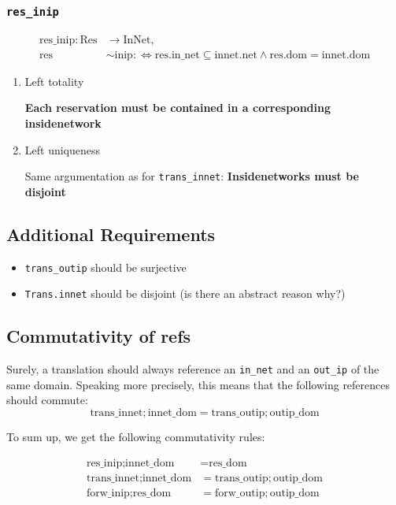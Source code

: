 \documentclass[11pt]{article}
\newcommand{\then}{\mathbin{;}}
\begin{document}
\subsubsection{\texttt{res\_inip}}
\label{sec:orgfc1458e}

\begin{align*}
\mathrm{res\_inip}\colon \mathrm{Res} &\to \mathrm{InNet},\\
\text{res} &\sim \text{inip} :\Leftrightarrow \text{res.in\_net} \subseteq \text{innet.net} \wedge \text{res.dom} = \text{innet.dom}
\end{align*}

\begin{enumerate}
\item Left totality
\label{sec:org8702994}

\textbf{\textbf{Each reservation must be contained in a corresponding insidenetwork}}

\item Left uniqueness
\label{sec:orgb32b1bd}

Same argumentation as for \texttt{trans\_innet}: \textbf{\textbf{Insidenetworks must be disjoint}}
\end{enumerate}

\subsection{Additional Requirements}
\label{sec:org5986b8c}

\begin{itemize}
\item \texttt{trans\_outip} should be surjective
\item \texttt{Trans.innet} should be disjoint (is there an abstract reason
why?)
\end{itemize}

\subsection{Commutativity of refs}
\label{sec:orgd22b6b6}

Surely, a translation should always reference an \texttt{in\_net} and an
\texttt{out\_ip} of the same domain.  Speaking more precisely, this means that
the following references should commute:$$
\text{trans\_innet}\then\text{innet\_dom} = \text{trans\_outip}\then\text{outip\_dom}
$$

To sum up, we get the following commutativity rules:

\begin{align}
\text{res\_inip}\then\text{innet\_dom} &= \text{res\_dom}\\
\text{trans\_innet}\then\text{innet\_dom} &= \text{trans\_outip}\then\text{outip\_dom}\\
\text{forw\_inip}\then\text{res\_dom} &= \text{forw\_outip}\then\text{outip\_dom}
\end{align}
\end{document}
